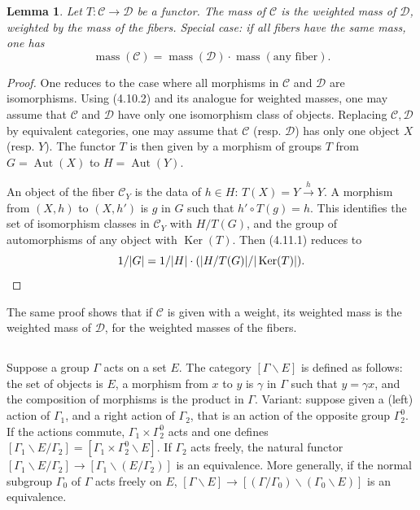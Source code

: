 \documentclass[11pt,a4paper]{article}
\theoremstyle{plain}
\newtheorem{lemma}[theorem]{Lemma}
\theoremstyle{definition}
\DeclareMathOperator{\Ker}{Ker}
\DeclareMathOperator{\Aut}{Aut}
\DeclareMathOperator{\mass}{mass}
\begin{document}
\begin{lemma}
Let $T: \mathcal{C} \to \mathcal{D}$ be a functor. The mass of $\mathcal{C}$ is the weighted mass of $\mathcal{D}$, weighted by the mass of the fibers. Special case: if all fibers have the same mass, one has
\begin{equation}
\mass(\mathcal{C}) = \mass(\mathcal{D}) \cdot \mass(\text{any fiber}). \tag{4.11.1}
\end{equation}
\end{lemma}

\begin{proof}
One reduces to the case where all morphisms in $\mathcal{C}$ and $\mathcal{D}$ are isomorphisms. Using (4.10.2) and its analogue for weighted masses, one may assume that $\mathcal{C}$ and $\mathcal{D}$ have only one isomorphism class of objects. Replacing $\mathcal{C}, \mathcal{D}$ by equivalent categories, one may assume that $\mathcal{C}$ (resp. $\mathcal{D}$) has only one object $X$ (resp. $Y$). The functor $T$ is then given by a morphism of groups $T$ from $G = \Aut(X)$ to $H = \Aut(Y)$.

An object of the fiber $\mathcal{C}_Y$ is the data of $h \in H$: $T(X) = Y \xrightarrow{h} Y$. A morphism from $(X,h)$ to $(X,h')$ is $g$ in $G$ such that $h' \circ T(g) = h$. This identifies the set of isomorphism classes in $\mathcal{C}_Y$ with $H/T(G)$, and the group of automorphisms of any object with $\Ker(T)$. Then (4.11.1) reduces to
\[
1/|G| = 1/|H| \cdot (|H/T(G)|/|\Ker(T)|). \qedhere
\]
\end{proof}

The same proof shows that if $\mathcal{C}$ is given with a weight, its weighted mass is the weighted mass of $\mathcal{D}$, for the weighted masses of the fibers.

\subsection{}

Suppose a group $\Gamma$ acts on a set $E$. The category $[\Gamma \backslash E]$ is defined as follows: the set of objects is $E$, a morphism from $x$ to $y$ is $\gamma$ in $\Gamma$ such that $y = \gamma x$, and the composition of morphisms is the product in $\Gamma$. Variant: suppose given a (left) action of $\Gamma_1$, and a right action of $\Gamma_2$, that is an action of the opposite group $\Gamma_2^0$. If the actions commute, $\Gamma_1 \times \Gamma_2^0$ acts and one defines $[\Gamma_1 \backslash E / \Gamma_2] = [\Gamma_1 \times \Gamma_2^0 \backslash E]$. If $\Gamma_2$ acts freely, the natural functor $[\Gamma_1 \backslash E / \Gamma_2] \to [\Gamma_1 \backslash (E/\Gamma_2)]$ is an equivalence. More generally, if the normal subgroup $\Gamma_0$ of $\Gamma$ acts freely on $E$, $[\Gamma \backslash E] \to [(\Gamma/\Gamma_0) \backslash (\Gamma_0 \backslash E)]$ is an equivalence.
\end{document}
